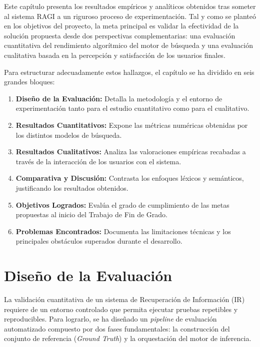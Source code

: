 \documentclass[../main.tex]{subfiles}
\begin{document}
Este capítulo presenta los resultados empíricos y analíticos obtenidos tras someter al sistema RAGI a un riguroso proceso de experimentación. Tal y como se planteó en los objetivos del proyecto, la meta principal es validar la efectividad de la solución propuesta desde dos perspectivas complementarias: una evaluación cuantitativa del rendimiento algorítmico del motor de búsqueda y una evaluación cualitativa basada en la percepción y satisfacción de los usuarios finales.

Para estructurar adecuadamente estos hallazgos, el capítulo se ha dividido en seis grandes bloques:
\begin{enumerate}
    \item \textbf{Diseño de la Evaluación:} Detalla la metodología y el entorno de experimentación tanto para el estudio cuantitativo como para el cualitativo.
    \item \textbf{Resultados Cuantitativos:} Expone las métricas numéricas obtenidas por los distintos modelos de búsqueda.
    \item \textbf{Resultados Cualitativos:} Analiza las valoraciones empíricas recabadas a través de la interacción de los usuarios con el sistema.
    \item \textbf{Comparativa y Discusión:} Contrasta los enfoques léxicos y semánticos, justificando los resultados obtenidos.
    \item \textbf{Objetivos Logrados:} Evalúa el grado de cumplimiento de las metas propuestas al inicio del Trabajo de Fin de Grado.
    \item \textbf{Problemas Encontrados:} Documenta las limitaciones técnicas y los principales obstáculos superados durante el desarrollo.
\end{enumerate}

\renewcommand{\sectionbreak}{}

\section{Diseño de la Evaluación}
\label{sec:resultados_evaluacion}

La validación cuantitativa de un sistema de Recuperación de Información (IR) requiere de un entorno controlado que permita ejecutar pruebas repetibles y reproducibles. Para lograrlo, se ha diseñado un \textit{pipeline} de evaluación automatizado compuesto por dos fases fundamentales: la construcción del conjunto de referencia (\textit{Ground Truth}) y la orquestación del motor de inferencia.
\end{document}
